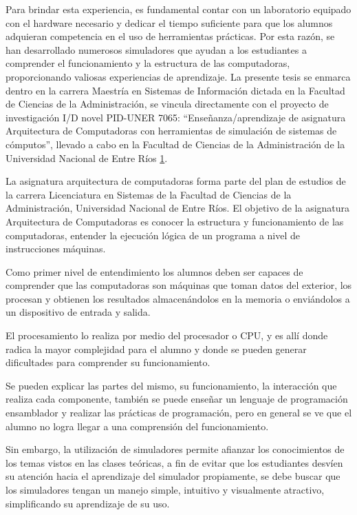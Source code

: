 \documentclass[12pt,twoside]{templates/unerthesis}
\begin{document}
Para brindar esta experiencia, es fundamental contar con un laboratorio equipado con el hardware necesario y dedicar el tiempo suficiente para que los alumnos adquieran competencia en el uso de herramientas prácticas. Por esta razón, se han desarrollado numerosos simuladores que ayudan a los estudiantes a comprender el funcionamiento y la estructura de las computadoras, proporcionando valiosas experiencias de aprendizaje.
La presente tesis se enmarca dentro en la carrera Maestría en Sistemas de Información dictada en la Facultad de Ciencias de la Administración, se vincula directamente con el proyecto de investigación I/D novel PID-UNER 7065: ``Enseñanza/aprendizaje de asignatura Arquitectura de Computadoras con herramientas de simulación de sistemas de cómputos'', llevado a cabo en la Facultad de Ciencias de la Administración de la Universidad Nacional de Entre Ríos \protect\hyperlink{ref-colombani_pid_2022}{1}.

La asignatura arquitectura de computadoras forma parte del plan de estudios de la carrera Licenciatura en Sistemas de la Facultad de Ciencias de la Administración, Universidad Nacional de Entre Ríos. El objetivo de la asignatura Arquitectura de Computadoras es conocer la estructura y funcionamiento de las computadoras, entender la ejecución lógica de un programa a nivel de instrucciones máquinas.

Como primer nivel de entendimiento los alumnos deben ser capaces de comprender que las computadoras son máquinas que toman datos del exterior, los procesan y obtienen los resultados almacenándolos en la memoria o enviándolos a un dispositivo de entrada y salida.

El procesamiento lo realiza por medio del procesador o CPU, y es allí donde radica la mayor complejidad para el alumno y donde se pueden generar dificultades para comprender su funcionamiento.

Se pueden explicar las partes del mismo, su funcionamiento, la interacción que realiza cada componente, también se puede enseñar un lenguaje de programación ensamblador y realizar las prácticas de programación, pero en general se ve que el alumno no logra llegar a una comprensión del funcionamiento.

Sin embargo, la utilización de simuladores permite afianzar los conocimientos de los temas vistos en las clases teóricas, a fin de evitar que los estudiantes desvíen su atención hacia el aprendizaje del simulador propiamente, se debe buscar que los simuladores tengan un manejo simple, intuitivo y visualmente atractivo, simplificando su aprendizaje de su uso.
\end{document}
